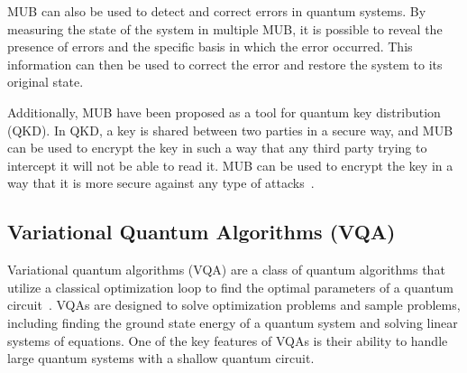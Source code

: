 MUB can also be used to detect and correct errors in quantum systems.
By measuring the state of the system in multiple MUB,
it is possible to reveal the presence of errors and the specific basis in which the error occurred.
This information can then be used to correct the error and restore the system to its original state.

Additionally, MUB have been proposed as a tool for quantum key distribution (QKD). In QKD,
a key is shared between two parties in a secure way, and MUB can be used to encrypt the key in such a way that any
third party trying to intercept it will not be able to read it.
MUB can be used to encrypt the key in a way that it is more secure against any type of attacks~\cite{wootters1989optimal}.

\subsection{Variational Quantum Algorithms (VQA)}\label{subsec:variational-quantum-algorithms}
Variational quantum algorithms (VQA) are a class of quantum algorithms that utilize a classical optimization loop to
find the optimal parameters of a quantum circuit~\cite{cerezo2021variational}.
VQAs are designed to solve optimization problems and sample problems,
including finding the ground state energy of a quantum system and solving linear systems of equations. One of the key features
of VQAs is their ability to handle large quantum systems with a shallow quantum circuit.

